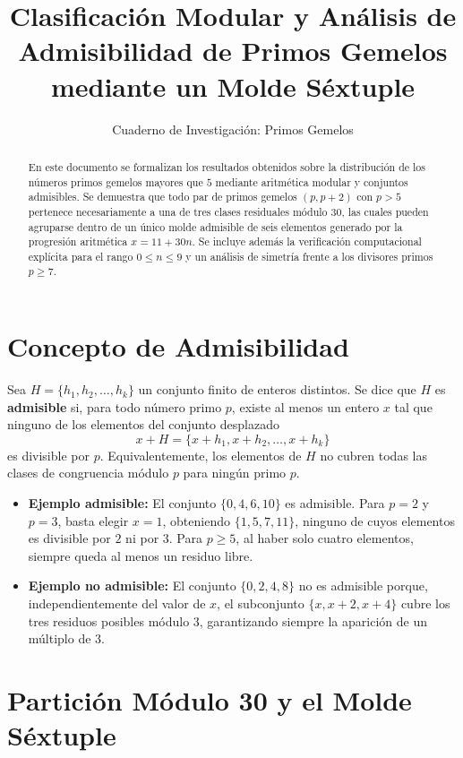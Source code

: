 \documentclass[11pt, a4paper]{article}
\title{\textbf{Clasificación Modular y Análisis de Admisibilidad de Primos Gemelos mediante un Molde Séxtuple}}
\author{Cuaderno de Investigación: Primos Gemelos}
\date{}
\begin{document}
\maketitle

\begin{abstract}
En este documento se formalizan los resultados obtenidos sobre la distribución de los números primos gemelos mayores que $5$ mediante aritmética modular y conjuntos admisibles. Se demuestra que todo par de primos gemelos $(p, p+2)$ con $p > 5$ pertenece necesariamente a una de tres clases residuales módulo $30$, las cuales pueden agruparse dentro de un único molde admisible de seis elementos generado por la progresión aritmética $x = 11 + 30n$. Se incluye además la verificación computacional explícita para el rango $0 \le n \le 9$ y un análisis de simetría frente a los divisores primos $p \ge 7$.
\end{abstract}

\section{Concepto de Admisibilidad}

Sea $H = \{h_1, h_2, \dots, h_k\}$ un conjunto finito de enteros distintos. Se dice que $H$ es \textbf{admisible} si, para todo número primo $p$, existe al menos un entero $x$ tal que ninguno de los elementos del conjunto desplazado
\[
x + H = \{x + h_1, x + h_2, \dots, x + h_k\}
\]
es divisible por $p$. Equivalentemente, los elementos de $H$ no cubren todas las clases de congruencia módulo $p$ para ningún primo $p$.

\begin{itemize}
    \item \textbf{Ejemplo admisible:} El conjunto $\{0, 4, 6, 10\}$ es admisible. Para $p = 2$ y $p = 3$, basta elegir $x = 1$, obteniendo $\{1, 5, 7, 11\}$, ninguno de cuyos elementos es divisible por $2$ ni por $3$. Para $p \ge 5$, al haber solo cuatro elementos, siempre queda al menos un residuo libre.
    \item \textbf{Ejemplo no admisible:} El conjunto $\{0, 2, 4, 8\}$ no es admisible porque, independientemente del valor de $x$, el subconjunto $\{x, x+2, x+4\}$ cubre los tres residuos posibles módulo $3$, garantizando siempre la aparición de un múltiplo de $3$.
\end{itemize}

\section{Partición Módulo 30 y el Molde Séxtuple}
\end{document}
